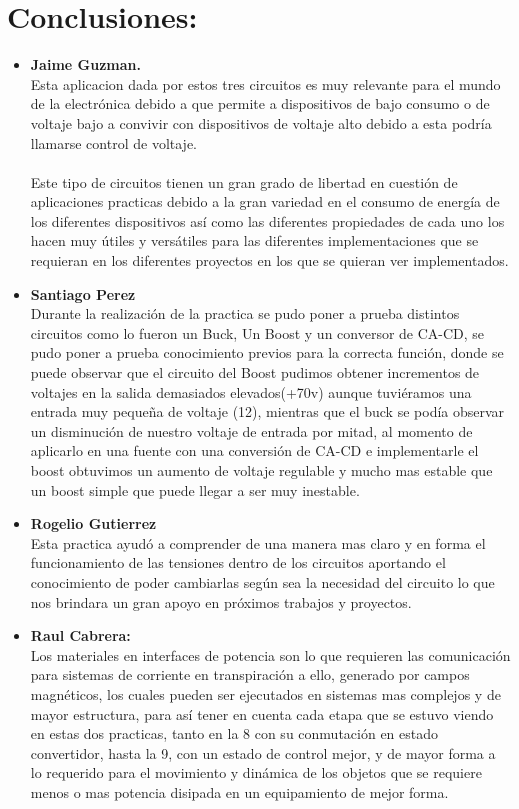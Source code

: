 \documentclass[12pt,letterpaper]{article}
\begin{document}
\newpage
\section{Conclusiones:}
\begin{itemize}
\item \textbf{Jaime Guzman.}\\
Esta aplicacion dada por estos tres circuitos es muy relevante para el mundo de la electrónica debido a que permite a dispositivos de bajo consumo o de voltaje bajo a convivir con dispositivos de voltaje alto debido a esta podría llamarse control de voltaje.\\\\
Este tipo de circuitos tienen un gran grado de libertad en cuestión de aplicaciones practicas debido a la gran variedad en el consumo de energía de los diferentes dispositivos así como las diferentes propiedades de cada uno los hacen muy útiles y versátiles para las diferentes implementaciones que se requieran en los diferentes proyectos en los que se quieran ver implementados.
\item \textbf {Santiago Perez}\\
Durante la realización de la practica se pudo poner a prueba distintos circuitos como lo fueron un Buck, Un Boost y un conversor de CA-CD, se pudo poner a prueba conocimiento previos para la correcta función, donde se puede observar que el circuito del Boost pudimos obtener incrementos de voltajes en la salida demasiados elevados(+70v) aunque tuviéramos una entrada muy pequeña de voltaje (12), mientras que el buck se podía observar un disminución de nuestro voltaje de entrada por mitad, al momento de aplicarlo en una fuente con una conversión de CA-CD e implementarle el boost obtuvimos un aumento de voltaje regulable y mucho mas estable que un boost simple que puede llegar a ser muy inestable.
\item \textbf{Rogelio Gutierrez}\\
Esta practica ayudó a comprender de una manera mas claro y en forma el funcionamiento de las tensiones dentro de los circuitos aportando el conocimiento de poder cambiarlas según sea la necesidad del circuito lo que nos brindara un gran apoyo en próximos trabajos y proyectos.
\item \textbf{Raul Cabrera:}\\
Los materiales en interfaces de potencia son lo que requieren las comunicación para sistemas de corriente en transpiración a ello, generado por campos magnéticos, los cuales pueden ser ejecutados en sistemas mas complejos y de mayor estructura, para así tener en cuenta cada etapa que se estuvo viendo en estas dos practicas, tanto en la 8 con su conmutación en estado convertidor, hasta la 9, con un estado de control mejor, y de mayor forma a lo requerido para el movimiento y dinámica de los objetos que se requiere menos o mas potencia disipada en un equipamiento de mejor forma.

\end{itemize}
\end{document}

